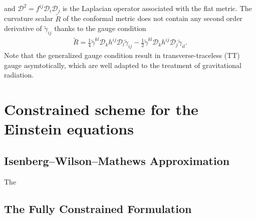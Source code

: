 and $\mathcal{D}^2 = f^{ij}\mathcal{D}_i \mathcal{D}_j$ is the Laplacian operator associated with the flat metric.
The curvature scalar $\tilde{R}$ of the conformal metric does not contain any second order derivative of $\tilde{\gamma}_{ij}$ thanks to the gauge condition
\begin{align}
    \tilde{R} = \frac{1}{4} \tilde{\gamma}^{kl} \mathcal{D}_k h^{ij} \mathcal{D}_l \tilde{\gamma}_{ij} 
    - \frac{1}{2} \tilde{\gamma}^{kl} \mathcal{D}_k h^{ij} \mathcal{D}_j \tilde{\gamma}_{il}.
\end{align}
Note that the generalized gauge condition result in transverse-traceless (TT) gauge asymtotically,
which are well adapted to the treatment of gravitational radiation.

\section{Constrained scheme for the Einstein equations}  %
\label{section2.5}

\subsection{Isenberg–Wilson–Mathews Approximation}  %
\label{section2.5.1}
The 

\subsection{The Fully Constrained Formulation}  %
\label{section2.5.2}

